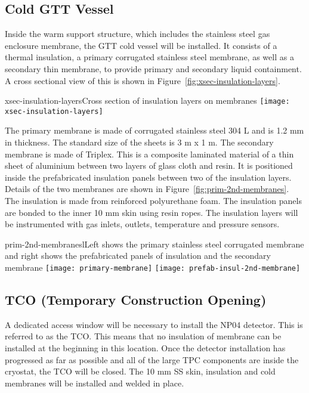 \subsection{Cold GTT Vessel}

Inside the warm support structure, which includes the stainless steel gas enclosure membrane, the GTT cold vessel will be installed. It consists of a thermal insulation, a primary corrugated stainless steel membrane, as well as a secondary thin membrane, to provide primary and secondary liquid containment. A cross sectional view of this is shown in Figure~\ref{fig:xsec-insulation-layers}.

\begin{cdrfigure}{xsec-insulation-layers}{Cross section of insulation layers on membranes}
  \texttt{[image: xsec-insulation-layers]}
\end{cdrfigure}


The primary membrane is made of corrugated stainless steel 304 L and is 1.2 mm in thickness.  The standard size of the sheets is 3 m x 1 m.  The secondary membrane is made of Triplex.  This is a composite laminated material of a thin sheet of aluminium between two layers of glass cloth and resin.  It is positioned inside the prefabricated insulation panels between two of the insulation layers.  Details of the two membranes are shown in Figure~\ref{fig:prim-2nd-membranes}.   The insulation is made from reinforced polyurethane foam.  The insulation panels are bonded to the inner 10 mm skin using resin ropes.  The insulation layers will be instrumented with gas inlets, outlets, temperature and pressure sensors.

\begin{cdrfigure}{prim-2nd-membranes}{lLeft shows the primary stainless steel corrugated membrane and right shows the prefabricated panels of insulation and the secondary membrane}
  \texttt{[image: primary-membrane]}
  \texttt{[image: prefab-insul-2nd-membrane]}
\end{cdrfigure}

\subsection{TCO (Temporary Construction Opening)}

A dedicated access window will be necessary to install the NP04 detector.  This is referred to as the TCO.  This means that no insulation of membrane can be installed at the beginning in this location. Once the detector installation has progressed as far as possible and all of the large TPC components are inside the cryostat, the TCO will be closed.  The 10 mm SS skin, insulation and cold membranes will be installed and welded in place. 

